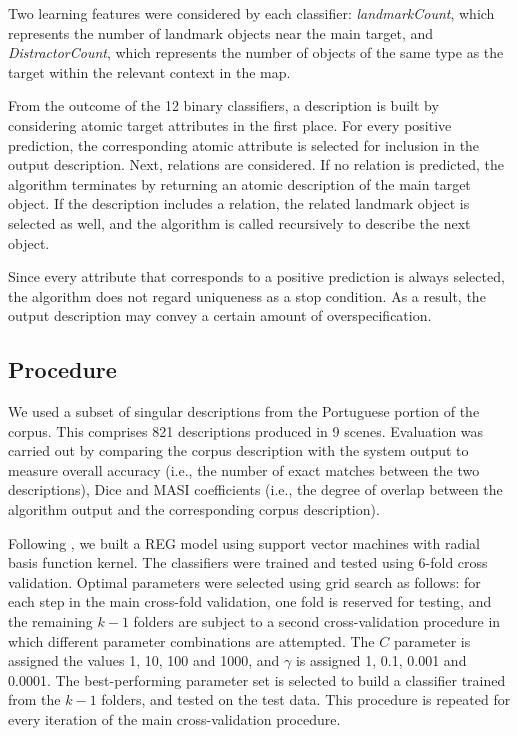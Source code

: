 \documentclass{article}
\begin{document}
Two learning features were considered by each classifier: {\em landmarkCount}, which represents the number of landmark objects near the main target, and {\em DistractorCount}, which represents the number of objects of the same type as the target within the relevant context in the map.

From the outcome of the 12 binary classifiers, a description is built by considering atomic target attributes in the first place. For every positive prediction, the corresponding atomic attribute is selected for inclusion in the output description. Next, relations are considered. If no relation is predicted, the algorithm terminates by returning an atomic description  of the main target object. If the description includes a relation, the related landmark object is selected  as well, and the algorithm is called recursively to describe the next object.

Since every attribute that corresponds to a positive prediction is always selected, the algorithm does not regard uniqueness as a stop condition. As a result, the output description may convey a certain amount of overspecification.


\subsection{Procedure}

We used a subset of singular descriptions from the Portuguese portion of the corpus. This comprises  821 descriptions produced in 9 scenes. Evaluation was carried out by comparing the corpus description with the system output to measure overall accuracy (i.e., the number of exact matches between the two descriptions), Dice \cite{dice} and MASI \cite{masi} coefficients (i.e., the degree of overlap between the algorithm output and the corresponding corpus description).

Following \cite{thiago-svm}, we built a REG model using support vector machines with radial basis function kernel. The classifiers were trained and tested using 6-fold cross validation. Optimal parameters were selected using grid search as follows: for each step in the main cross-fold validation, one fold is reserved for testing, and the remaining $k-1$ folders are subject  to a second cross-validation procedure in which different parameter combinations are attempted. The $C$ parameter is assigned the values 1, 10, 100 and 1000, and $\gamma$ is assigned 1, 0.1, 0.001 and 0.0001. The best-performing parameter set is selected to build a classifier trained from the $k-1$ folders, and tested on the test data. This procedure is repeated for every iteration of the main cross-validation procedure.
\end{document}

